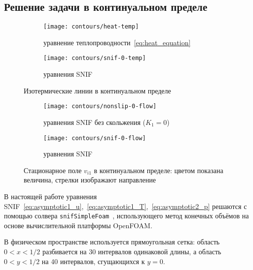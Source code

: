 \documentclass[10pt]{article}
\begin{document}
\subsection{Решение задачи в континуальном пределе}

\begin{figure}
    \centering
    \begin{subfigure}[b]{0.5\linewidth}
        \centering
        \texttt{[image: contours/heat-temp]}
        \caption{уравнение теплопроводности~\eqref{eq:heat_equation}}
        \label{fig:continuum:temp-heat}
    \end{subfigure}%
    \begin{subfigure}[b]{0.5\linewidth}
        \centering
        \texttt{[image: contours/snif-0-temp]}
        \caption{уравнения SNIF}
        \label{fig:continuum:temp-snif}
    \end{subfigure}
    \caption{Изотермические линии в континуальном пределе}
    \label{fig:continuum:temp}
\end{figure}

\begin{figure}
    \centering
    \begin{subfigure}{0.5\linewidth}
        \centering
        \texttt{[image: contours/nonslip-0-flow]}
        \caption{уравнения SNIF без скольжения (\(K_1=0\))}
        \label{fig:continuum:flow-nonslip}
    \end{subfigure}%
    \begin{subfigure}{0.5\linewidth}
        \centering
        \texttt{[image: contours/snif-0-flow]}
        \caption{уравнения SNIF}
        \label{fig:continuum:flow-snif}
    \end{subfigure}
    \caption{Стационарное поле \(v_{i1}\) в континуальном пределе: цветом показана величина, стрелки изображают направление}
    \label{fig:continuum:flow}
\end{figure}

В настоящей работе уравнения SNIF~\eqref{eq:asymptotic1_u},~\eqref{eq:asymptotic1_T},~\eqref{eq:asymptotic2_p}
решаются с помощью солвера \verb+snifSimpleFoam+~\cite{Rogozin2014},
использующего метод конечных объёмов на основе вычислительной платформы OpenFOAM\textregistered{}.

В физическом пространстве используется прямоугольная сетка:
область \(0<x<1/2\) разбивается на 30 интервалов одинаковой длины,
а область \(0<y<1/2\) на 40 интервалов, сгущающихся к \(y=0\).
\end{document}
